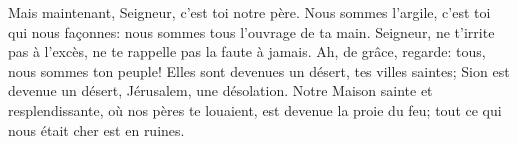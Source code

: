 Mais maintenant, Seigneur, c’est toi notre père.
	Nous sommes l’argile, c’est toi qui nous façonnes:
	nous sommes tous l’ouvrage de ta main.
Seigneur, ne t’irrite pas à l’excès,
	ne te rappelle pas la faute à jamais.
	Ah, de grâce, regarde: tous, nous sommes ton peuple!
Elles sont devenues un désert, tes villes saintes;
	Sion est devenue un désert, Jérusalem, une désolation.
Notre Maison sainte et resplendissante, où nos pères te louaient,
	est devenue la proie du feu;
	tout ce qui nous était cher est en ruines.
